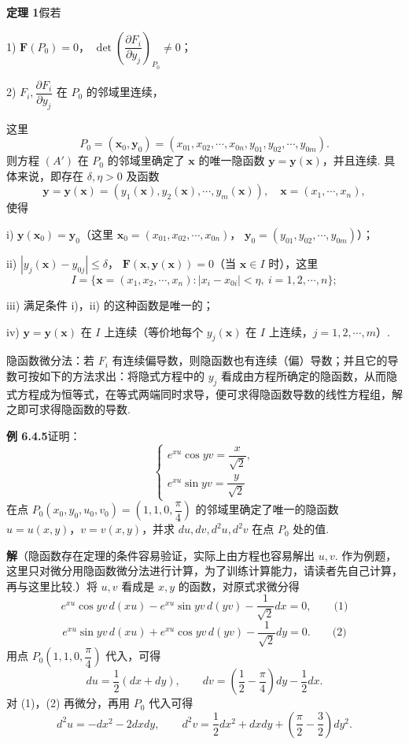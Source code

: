 \documentclass[UTF8,12pt,a4paper,fontset=fandol]{ctexart}
\begin{document}
\noindent\textbf{定理 1}\quad 假若

1) $\mathbf F(P_0)=0$，
$\det\left(\dfrac{\partial F_i}{\partial y_j}\right)_{P_0}\ne0$；

2) $F_i,\dfrac{\partial F_i}{\partial y_j}$ 在 $P_0$ 的邻域里连续，

\noindent 这里
\[
  P_0=(\mathbf x_0,\mathbf y_0)
  =(x_{01},x_{02},\cdots,x_{0n},y_{01},y_{02},\cdots,y_{0m}).
\]
则方程 $(A')$ 在 $P_0$ 的邻域里确定了 $\mathbf x$ 的唯一隐函数
$\mathbf y=\mathbf y(\mathbf x)$，并且连续. 具体来说，即存在
$\delta,\eta>0$ 及函数
\[
  \mathbf y=\mathbf y(\mathbf x)
  =(y_1(\mathbf x),y_2(\mathbf x),\cdots,y_m(\mathbf x)),
  \quad \mathbf x=(x_1,\cdots,x_n),
\]
使得

i) $\mathbf y(\mathbf x_0)=\mathbf y_0$（这里
$\mathbf x_0=(x_{01},x_{02},\cdots,x_{0n})$，
$\mathbf y_0=(y_{01},y_{02},\cdots,y_{0m})$）；

ii) $|y_j(\mathbf x)-y_{0j}|\le\delta$，
$\mathbf F(\mathbf x,\mathbf y(\mathbf x))=0$（当 $\mathbf x\in I$ 时），这里
\[
  I=\{\mathbf x=(x_1,x_2,\cdots,x_n): |x_i-x_{0i}|<\eta,\ i=1,2,\cdots,n\};
\]

iii) 满足条件 i)，ii) 的这种函数是唯一的；

iv) $\mathbf y=\mathbf y(\mathbf x)$ 在 $I$ 上连续（等价地每个 $y_j(\mathbf x)$ 在 $I$ 上连续，$j=1,2,\cdots,m$）.

\noindent 隐函数微分法：若 $F_i$ 有连续偏导数，则隐函数也有连续（偏）导数；并且它的导数可按如下的方法求出：将隐式方程中的 $y_j$ 看成由方程所确定的隐函数，从而隐式方程成为恒等式，在等式两端同时求导，便可求得隐函数导数的线性方程组，解之即可求得隐函数的导数.

\noindent\textbf{例 6.4.5}\quad 证明：
\[
\begin{cases}
  e^{xu}\cos yv=\dfrac{x}{\sqrt2},\\[4pt]
  e^{xu}\sin yv=\dfrac{y}{\sqrt2}
\end{cases}
\]
在点 $P_0(x_0,y_0,u_0,v_0)=\left(1,1,0,\dfrac\pi4\right)$ 的邻域里确定了唯一的隐函数
$u=u(x,y)$，$v=v(x,y)$，并求 $du,dv,d^2u,d^2v$ 在点 $P_0$ 处的值.

\noindent\textbf{解}\quad （隐函数存在定理的条件容易验证，实际上由方程也容易解出 $u,v$. 作为例题，这里只对微分用隐函数微分法进行计算，为了训练计算能力，请读者先自己计算，再与这里比较.）将 $u,v$ 看成是 $x,y$ 的函数，对原式求微分得
\[
  e^{xu}\cos yv\,d(xu)-e^{xu}\sin yv\,d(yv)-\frac1{\sqrt2}dx=0, \qquad\text{(1)}
\]
\[
  e^{xu}\sin yv\,d(xu)+e^{xu}\cos yv\,d(yv)-\frac1{\sqrt2}dy=0. \qquad\text{(2)}
\]
用点 $P_0\left(1,1,0,\dfrac\pi4\right)$ 代入，可得
\[
  du=\frac12(dx+dy),\qquad
  dv=\left(\frac12-\frac\pi4\right)dy-\frac12dx.
\]
对 (1)，(2) 再微分，再用 $P_0$ 代入可得
\[
  d^2u=-dx^2-2dxdy,\qquad
  d^2v=\frac12dx^2+dxdy+\left(\frac\pi2-\frac32\right)dy^2.
\]
\end{document}
